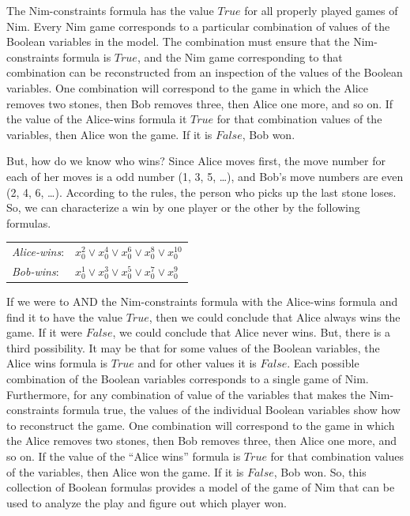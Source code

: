 {The Nim-constraints formula has the value $True$ for all properly played games of Nim.
Every Nim game corresponds to a particular combination of values of
the Boolean variables in the model.
The combination must ensure that the Nim-constraints formula is $True$, and
the Nim game corresponding to that combination can be reconstructed
from an inspection of the values of the Boolean variables.
One combination will correspond to the game in which the Alice removes two stones,
then Bob removes three, then Alice one more, and so on.
If the value of the Alice-wins formula it $True$
for that combination values of the variables,
then Alice won the game. If it is $False$, Bob won.

But, how do we know who wins?
Since Alice moves first, the move number for each of her moves is a odd number (1, 3, 5, \dots),
and Bob's move numbers are even (2, 4, 6, \dots).
According to the rules, the person who picks up the last stone loses.
So, we can characterize a win by one player or the other by
the following formulas.
\begin{center}
\label{alice-wins-formula}
\begin{tabular} {ll}
\emph{Alice-wins}: & $x_{0}^{2} \vee x_{0}^{4} \vee x_{0}^{6} \vee x_{0}^{8} \vee x_{0}^{10}$ \\
\emph{Bob-wins}:   & $x_{0}^{1} \vee x_{0}^{3} \vee x_{0}^{5} \vee x_{0}^{7} \vee x_{0}^{9}$  \\
\end{tabular}
\end{center}

If we were to AND the Nim-constraints formula with the Alice-wins formula
and find it to have the value $True$, then we could conclude that Alice always wins the game.
If it were $False$, we could conclude that Alice never wins.
But, there is a third possibility.
It may be that for some values of the Boolean variables,
the Alice wins formula is $True$
and for other values it is $False$.
Each possible combination of the Boolean variables
corresponds to a single game of Nim.
Furthermore, for any combination of value of the variables that makes the
Nim-constraints formula true, the values of the individual Boolean variables
show how to reconstruct the game.
One combination will correspond to the game in which the Alice removes two stones,
then Bob removes three, then Alice one more, and so on.
If the value of the ``Alice wins'' formula is $True$ for that
combination values of the variables, then Alice won the game.
If it is $False$, Bob won.
So, this collection of Boolean formulas provides a model of the game of Nim
that can be used to analyze the play and figure out which player won.

}
